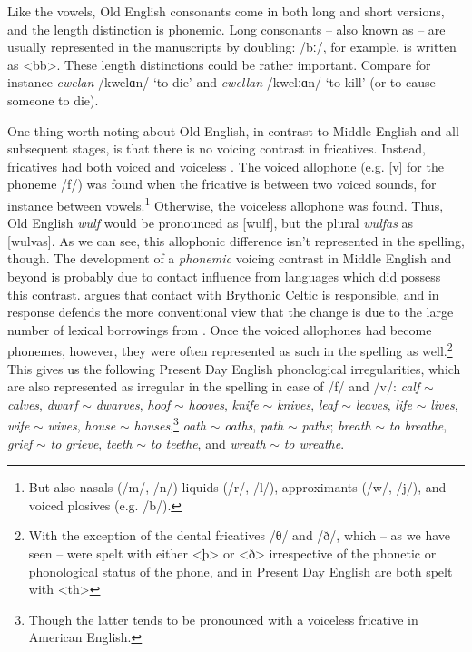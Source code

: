 \noindent Like the vowels, Old English consonants come in both long and short versions, and the length distinction is phonemic. Long consonants -- also known as  -- are usually represented in the manuscripts by doubling: /bː/, for example, is written as <bb>. These length distinctions could be rather important. Compare for instance \textit{cwelan} /kwelɑn/ `to die' and \textit{cwellan} /kwelːɑn/ `to kill' (or to cause someone to die).

One thing worth noting about Old English, in contrast to Middle English and all subsequent stages, is that there is no  voicing contrast in fricatives. Instead, fricatives had both voiced and voiceless . The voiced allophone (e.g. [v] for the phoneme /f/) was found when the fricative is between two voiced sounds, for instance between vowels.\footnote{But also nasals (/m/, /n/) liquids (/r/, /l/), approximants (/w/, /j/), and voiced plosives (e.g. /b/).} Otherwise, the voiceless allophone was found. Thus, Old English \textit{wulf} would be pronounced as [wulf], but the plural \textit{wulfas} as [wulvas]. As we can see, this allophonic difference isn't represented in the spelling, though. The development of a \emph{phonemic} voicing contrast in Middle English and beyond is probably due to contact influence from languages which did possess this contrast. \citet{Laker2009} argues that contact with Brythonic Celtic is responsible, and in response \citet{Minkova2011} defends the more conventional view that the change is due to the large number of lexical borrowings from . Once the voiced allophones had become phonemes, however, they were often represented as such in the spelling as well.\footnote{With the exception of the dental fricatives /θ/ and /ð/, which -- as we have seen -- were spelt with either <þ> or <ð> irrespective of the phonetic or phonological status of the phone, and in Present Day English are both spelt with <th>} This gives us the following Present Day English phonological irregularities, which are also represented as irregular in the spelling in case of /f/ and /v/: \textit{calf} $\sim$ \textit{calves}, \textit{dwarf} $\sim$ \textit{dwarves}, \textit{hoof} $\sim$ \textit{hooves}, \textit{knife} $\sim$ \textit{knives}, \textit{leaf} $\sim$ \textit{leaves}, \textit{life} $\sim$ \textit{lives}, \textit{wife} $\sim$ \textit{wives}, \textit{house} $\sim$ \textit{houses},\footnote{Though the latter tends to be pronounced with a voiceless fricative in American English.} \textit{oath} $\sim$ \textit{oaths}, \textit{path} $\sim$ \textit{paths}; \textit{breath} $\sim$ \textit{to breathe}, \textit{grief} $\sim$ \textit{to grieve}, \textit{teeth} $\sim$ \textit{to teethe}, and \textit{wreath} $\sim$ \textit{to wreathe}.


